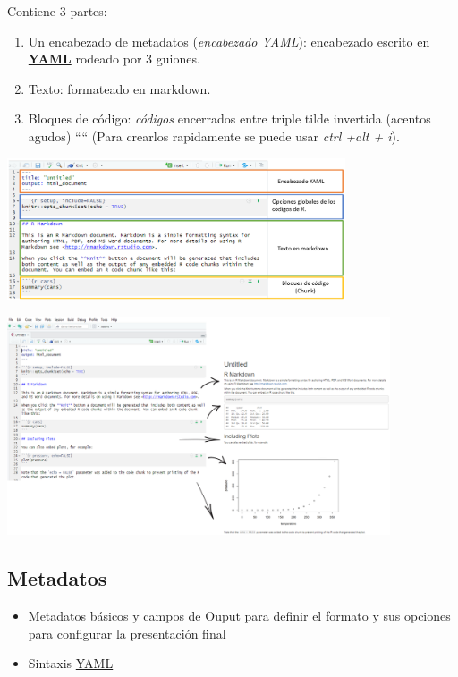 \documentclass[
]{article}
\providecommand{\tightlist}{%
  \setlength{\itemsep}{0pt}\setlength{\parskip}{0pt}}
\begin{document}
Contiene 3 partes:

\begin{enumerate}
\def\labelenumi{\arabic{enumi}.}
\tightlist
\item
  Un encabezado de metadatos (\emph{encabezado YAML}): encabezado
  escrito en \href{https://en.wikipedia.org/wiki/YAML}{\textbf{YAML}}
  rodeado por 3 guiones.
\item
  Texto: formateado en markdown.
\item
  Bloques de código: \emph{códigos} encerrados entre triple tilde
  invertida (acentos agudos) ```` (Para crearlos rapidamente se puede
  usar \emph{ctrl +alt + i}).
\end{enumerate}

\includegraphics[width=0.75\textwidth,height=\textheight]{images/estructura.png}

\includegraphics[width=0.85\textwidth,height=\textheight]{images/bloques.png}

\hypertarget{metadatos}{%
\subsection{Metadatos}\label{metadatos}}

\begin{itemize}
\tightlist
\item
  Metadatos básicos y campos de Ouput para definir el formato y sus
  opciones para configurar la presentación final
\item
  Sintaxis \href{https://en.wikipedia.org/wiki/YAML}{YAML}
\end{itemize}
\end{document}
